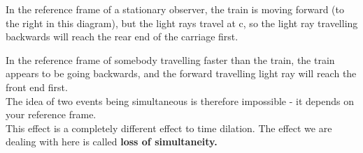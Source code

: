 \documentclass[main.tex]{subfiles}
\begin{document}
\begin{enumerate}
\begin{figure}[h]
\begin{center}
		
	\end{center}
\end{figure}
In the reference frame of a stationary observer, the train is moving forward (to the right in this diagram), but the light rays travel at c, so the light ray travelling backwards will reach the rear end of the carriage first. 
\\

\begin{figure}[h]
	\begin{center}
		
		
	\end{center}
\end{figure}
In the reference frame of somebody travelling faster than the train, the train appears to be going backwards, and the forward travelling light ray will reach the front end first. 
\\
The idea of two events being simultaneous is therefore impossible - it depends on your reference frame.
\\

This effect is  a completely different effect to time dilation.  The effect we are dealing with here is called \bf loss of simultaneity.\normalfont

\end{enumerate}



\normalsize	
\end{document}
